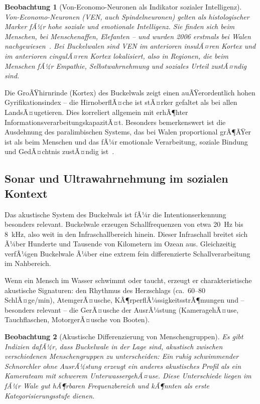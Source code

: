 ﻿\documentclass[12pt,a4paper]{article}
\newtheorem{beobachtung}{Beobachtung}[section]
\theoremstyle{definition}
\theoremstyle{remark}
\begin{document}
\begin{beobachtung}[Von-Economo-Neuronen als Indikator sozialer Intelligenz]
  \label{obs:ven}
  Von-Economo-Neuronen (VEN, auch Spindelneuronen) gelten als histologischer
  Marker fÃ¼r hohe soziale und emotionale Intelligenz. Sie finden sich beim
  Menschen, bei Menschenaffen, Elefanten -- und wurden 2006 erstmals bei
  Walen nachgewiesen~\cite{hof2007spindle}. Bei Buckelwalen sind VEN im
  anterioren insulÃ¤ren Kortex und im anterioren cingulÃ¤ren Kortex lokalisiert,
  also in Regionen, die beim Menschen fÃ¼r Empathie, Selbstwahrnehmung und
  soziales Urteil zustÃ¤ndig sind.
\end{beobachtung}

Die GroÃŸhirnrinde (Kortex) des Buckelwals zeigt einen auÃŸerordentlich hohen
Gyrifikationsindex -- die HirnoberflÃ¤che ist stÃ¤rker gefaltet als bei allen
LandsÃ¤ugetieren. Dies korreliert allgemein mit erhÃ¶hter InformationsverarbeitungskapazitÃ¤t.
Besonders bemerkenswert ist die Ausdehnung des paralimbischen Systems,
das bei Walen proportional grÃ¶ÃŸer ist als beim Menschen und das fÃ¼r
emotionale Verarbeitung, soziale Bindung und GedÃ¤chtnis zustÃ¤ndig ist~\cite{marino2007cetacean}.

\subsection{Sonar und Ultrawahrnehmung im sozialen Kontext}

Das akustische System des Buckelwals ist fÃ¼r die Intentionserkennung besonders
relevant. Buckelwale erzeugen Schallfrequenzen von etwa 20~Hz bis 8~kHz, also
weit in den Infraschallbereich hinein. Dieser Infraschall breitet sich Ã¼ber
Hunderte und Tausende von Kilometern im Ozean aus. Gleichzeitig verfÃ¼gen
Buckelwale Ã¼ber eine extrem fein differenzierte Schallverarbeitung im Nahbereich.

Wenn ein Mensch im Wasser schwimmt oder taucht, erzeugt er charakteristische
akustische Signaturen: den Rhythmus des Herzschlags (ca.\ 60--80 SchlÃ¤ge/min),
AtemgerÃ¤usche, KÃ¶rperflÃ¼ssigkeitsstrÃ¶mungen und -- besonders relevant -- die
GerÃ¤usche der AusrÃ¼stung (KameragehÃ¤use, Tauchflaschen, MotorgerÃ¤usche von Booten).

\begin{beobachtung}[Akustische Differenzierung von Menschengruppen]
  \label{obs:akustik}
  Es gibt Indizien dafÃ¼r, dass Buckelwale in der Lage sind, akustisch zwischen
  verschiedenen Menschengruppen zu unterscheiden: Ein ruhig schwimmender Schnorchler
  ohne AusrÃ¼stung erzeugt ein anderes akustisches Profil als ein Kamerateam mit
  schwerem UnterwassergehÃ¤use. Diese Unterschiede liegen im fÃ¼r Wale gut
  hÃ¶rbaren Frequenzbereich und kÃ¶nnten als erste Kategorisierungsstufe dienen.
\end{beobachtung}
\end{document}
